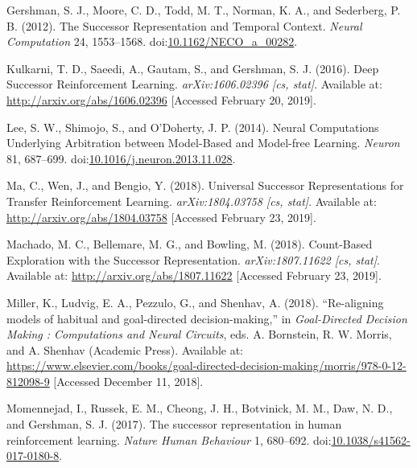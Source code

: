 \documentclass[
  11pt,
]{article}
\newlength{\cslhangindent}
\newlength{\cslentryspacingunit} %
\newenvironment{CSLReferences}[2] %
 {%
  \setlength{\parindent}{0pt}
  \ifodd #1
  \let\oldpar\par
  \def\par{\hangindent=\cslhangindent\oldpar}
  \fi
  \setlength{\parskip}{#2\cslentryspacingunit}
 }%
 {}
\begin{document}
\begin{CSLReferences}{1}{0}
\leavevmode{}%
Gershman, S. J., Moore, C. D., Todd, M. T., Norman, K. A., and
Sederberg, P. B. (2012). The {Successor Representation} and {Temporal
Context}. \emph{Neural Computation} 24, 1553--1568.
doi:\href{https://doi.org/10.1162/NECO_a_00282}{10.1162/NECO\_a\_00282}.

\leavevmode{}%
Kulkarni, T. D., Saeedi, A., Gautam, S., and Gershman, S. J. (2016).
Deep {Successor Reinforcement Learning}. \emph{arXiv:1606.02396 {[}cs,
stat{]}}. Available at: \url{http://arxiv.org/abs/1606.02396}
{[}Accessed February 20, 2019{]}.

\leavevmode{}%
Lee, S. W., Shimojo, S., and O'Doherty, J. P. (2014). Neural
{Computations Underlying Arbitration} between {Model}-{Based} and
{Model}-free {Learning}. \emph{Neuron} 81, 687--699.
doi:\href{https://doi.org/10.1016/j.neuron.2013.11.028}{10.1016/j.neuron.2013.11.028}.

\leavevmode{}%
Ma, C., Wen, J., and Bengio, Y. (2018). Universal {Successor
Representations} for {Transfer Reinforcement Learning}.
\emph{arXiv:1804.03758 {[}cs, stat{]}}. Available at:
\url{http://arxiv.org/abs/1804.03758} {[}Accessed February 23, 2019{]}.

\leavevmode{}%
Machado, M. C., Bellemare, M. G., and Bowling, M. (2018). Count-{Based
Exploration} with the {Successor Representation}. \emph{arXiv:1807.11622
{[}cs, stat{]}}. Available at: \url{http://arxiv.org/abs/1807.11622}
{[}Accessed February 23, 2019{]}.

\leavevmode{}%
Miller, K., Ludvig, E. A., Pezzulo, G., and Shenhav, A. (2018).
{``Re-aligning models of habitual and goal-directed decision-making,''}
in \emph{Goal-{Directed Decision Making} : Computations and {Neural
Circuits}}, eds. A. Bornstein, R. W. Morris, and A. Shenhav ({Academic
Press}). Available at:
\url{https://www.elsevier.com/books/goal-directed-decision-making/morris/978-0-12-812098-9}
{[}Accessed December 11, 2018{]}.

\leavevmode{}%
Momennejad, I., Russek, E. M., Cheong, J. H., Botvinick, M. M., Daw, N.
D., and Gershman, S. J. (2017). The successor representation in human
reinforcement learning. \emph{Nature Human Behaviour} 1, 680--692.
doi:\href{https://doi.org/10.1038/s41562-017-0180-8}{10.1038/s41562-017-0180-8}.


\end{CSLReferences}
\end{document}
